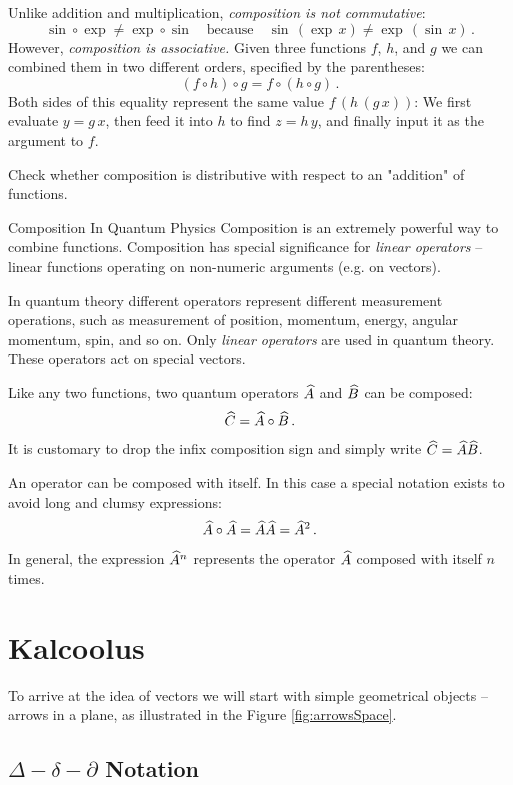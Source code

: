 Unlike addition and multiplication, \emph{composition is not commutative}:
\[
\sin\circ\exp\ne\exp\circ\sin\quad\textrm{because}\quad\sin\,(\exp\, x) \ne \exp\,(\sin\, x)\,.
\]
However, \emph{composition is associative.} Given three functions $f$, $h$, and $g$ we can combined them in two different orders, specified by the parentheses:
\[
(f\circ h)\circ g = f\circ(h\circ g)\,.
\]
Both sides of this equality represent the same value $f\,(h\, (g\, x))$: We first evaluate $y=g\, x$, then feed it into $h$ to find $z=h\,y$, and finally input it as the argument to $f$.

\begin{exercise}
	Check whether composition is distributive with respect to an "addition" of functions.
\end{exercise}

\begin{mybio}{Composition In Quantum Physics}
	Composition is an extremely powerful way to combine functions. Composition has special significance for \emph{linear operators} -- linear functions operating on non-numeric arguments (e.g. on vectors). 
	
	In quantum theory different operators represent different measurement operations, such as  measurement of position, momentum, energy, angular momentum, spin, and so on. Only \emph{linear operators} are used in quantum theory. These operators act on special vectors.
	
	Like any two functions, two quantum operators $\widehat{A}$ and $\widehat{B}$ can be composed:
	\[
	\widehat{C} = \widehat{A}\circ\widehat{B}\,.
	\]
	It is customary to drop the infix composition sign and simply write $\widehat{C} = \widehat{A}\widehat{B}$.
	
	An operator can be composed with itself. In this case a special notation exists to avoid long and clumsy expressions:
	\[
		\widehat{A}\circ\widehat{A}=\widehat{A}\widehat{A}=\widehat{A}^2\,.
	\]
	In general, the expression $\widehat{A}^n$ represents the operator $\widehat{A}$ composed with itself $n$ times.
	
\end{mybio}

\section{Kalcoolus}

To arrive at the idea of vectors we will start with simple geometrical
objects -- arrows in a plane, as illustrated in the Figure \ref{fig:arrowsSpace}.

\subsection{$\Delta-\delta-\partial$ Notation}

